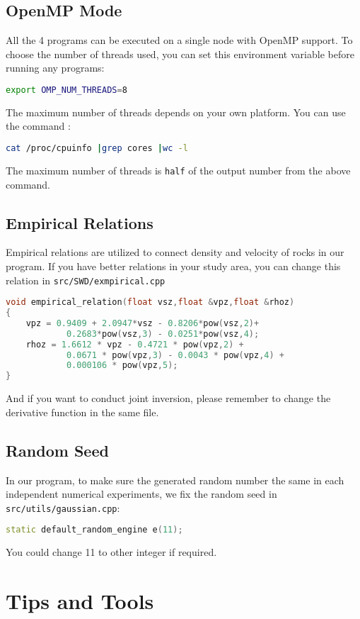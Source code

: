 \documentclass[UTF8]{article}
\begin{document}
\subsection{OpenMP Mode}
All the 4 programs can be executed on a single node with OpenMP support. To choose the number of threads used, you can set this environment variable before running any programs:
\begin{lstlisting}[language=bash]
export OMP_NUM_THREADS=8
\end{lstlisting}
The maximum number of threads depends on your own platform. You can use the command :
\begin{lstlisting}[language=bash]
cat /proc/cpuinfo |grep cores |wc -l
\end{lstlisting}
The maximum number of threads is \texttt{half} of the output number from the above command. 

\subsection{Empirical Relations}
Empirical relations are utilized to connect density and 
velocity of rocks in our program. If you have better relations 
in your study area, you can change this relation 
in \verb!src/SWD/exmpirical.cpp! 
\begin{lstlisting}[language=c++]
void empirical_relation(float vsz,float &vpz,float &rhoz)
{
    vpz = 0.9409 + 2.0947*vsz - 0.8206*pow(vsz,2)+ 
            0.2683*pow(vsz,3) - 0.0251*pow(vsz,4);
    rhoz = 1.6612 * vpz - 0.4721 * pow(vpz,2) + 
            0.0671 * pow(vpz,3) - 0.0043 * pow(vpz,4) + 
            0.000106 * pow(vpz,5);
}
\end{lstlisting}
And if you want to conduct joint inversion, please remember to
change the derivative function in the same file.

\subsection{Random Seed}
In our program, to make sure the generated random number the same
in each independent numerical experiments, we fix the random seed
in \texttt{src/utils/gaussian.cpp}:
\begin{lstlisting}[language=c++]
static default_random_engine e(11);
\end{lstlisting}
You could change 11 to other integer if required.

\section{Tips and Tools}
\end{document}
